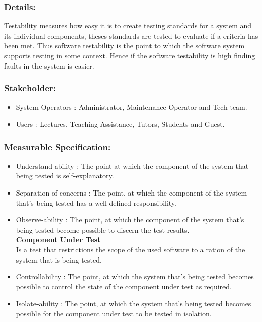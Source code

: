 \documentclass[11pt]{article}
\begin{document}
		\subsubsection{Details:}
			\textbf{}Testability measures how easy it is to create testing standards for a system and its individual components, theses standards are tested to evaluate if a criteria has been met. Thus software testability is the point to which the software system supports testing in some context. Hence if the software testability is high finding faults in the system is easier.
		
		\subsubsection{Stakeholder:}
		\begin{itemize}
			\item System Operators : Administrator, Maintenance Operator and Tech-team.
			\item Users : Lectures, Teaching Assistance, Tutors, Students and Guest.
			\end{itemize}		
		
		\subsubsection{Measurable Specification:}
		\begin{itemize}
			\item Understand-ability : The point at which the component of the system that being tested is self-explanatory.
			\item Separation of concerns : The point, at which the component of the system that's being tested has a well-defined responsibility.
			\item Observe-ability : The point, at which the component of the system that’s being tested become possible to discern the test results. \\
						
			\textbf{Component Under Test}\\
			Is a test that restrictions the scope of the used software to a ration of the system that is being tested.
			
			\item Controllability : The point, at which the system that’s being tested becomes possible to control the state of the component under test as required.
			\item Isolate-ability : The point, at which the system that’s being tested becomes possible for the component under test to be tested in isolation.
			
		\end{itemize}
		
\end{document}
